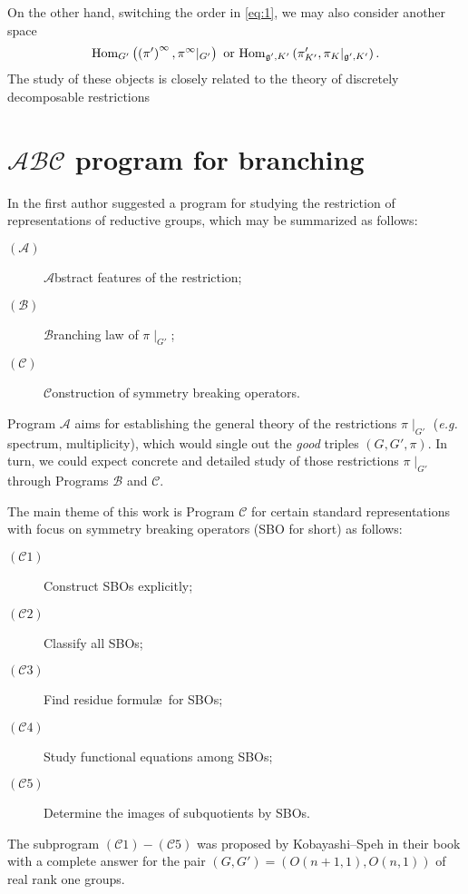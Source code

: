\documentclass[reqno,12pt]{pja00} %
\newcommand{\Hom}{\mbox{\normalfont Hom}}
\theoremstyle{definition}
\theoremstyle{exampstyle} \newtheorem{examp}[theorem]{Theorem}
\begin{document}
On the other hand, switching the order in \eqref{eq:1}, we may also consider another space
\begin{equation*}
	\Hom_{G'}\left( \left( \pi' \right)^\infty,\pi^\infty\kern-0.1cm\mid_{G'} \right)\mbox{ or }\Hom_{\mathfrak{g}',K'}\left( \pi_{K'}',\pi_{K}\kern-0.1cm\mid_{\mathfrak{g}',K'} \right).
\end{equation*}
The study of these objects is closely related to the theory of discretely decomposable restrictions \cite{kobayashi1998discrete2,kobayashi1998discrete3}

\section{$\mathcal{A}\mathcal{B}\mathcal{C}$ program for branching}

In {\cite{kobayashi2015program}} the first author suggested a program
for studying the restriction of representations of reductive groups, which may be summarized
as follows:
\begin{description}
  \item[$(\mathcal{A})$] $\mathcal{A}$bstract features of the restriction;
  
  \item[$(\mathcal{B})$] $\mathcal{B}$ranching law of $\pi\!\mid_{G'}$;
  
  \item[$(\mathcal{C})$] $\mathcal{C}$onstruction of symmetry breaking operators.
\end{description}
Program $\mathcal{A}$ aims for establishing the general theory of the restrictions $\pi\!\mid_{G'}$
({\it e.g.} spectrum, multiplicity), which would single out the {\it good} triples $\left( G,G',\pi \right)$. In turn, we could expect concrete and detailed study of those restrictions
$\pi\!\mid_{G'}$ through Programs $\mathcal{B}$ and $\mathcal{C}$.

The main theme of this work is Program ${\mathcal{C}}$ for certain standard
representations with focus on symmetry breaking operators (SBO for short) as follows:
\begin{description}
  \item[$(\mathcal{C}1)$] Construct SBOs explicitly;
  \item[$(\mathcal{C}2)$] Classify all SBOs;
  \item[$(\mathcal{C}3)$] Find residue formul\ae\, for SBOs;
  \item[$(\mathcal{C}4)$] Study functional equations among SBOs;
  \item[$(\mathcal{C}5)$] Determine the images of subquotients by SBOs.
\end{description}
The subprogram $(\mathcal{C}1) - (\mathcal{C}5)$ was proposed by
Kobayashi--Speh in their book {\cite{kobayashi2015symmetry}} with
a complete answer %
for the
pair $(G, G') = (O (n + 1, 1), O (n, 1))$ of real rank one groups.
\end{document}
